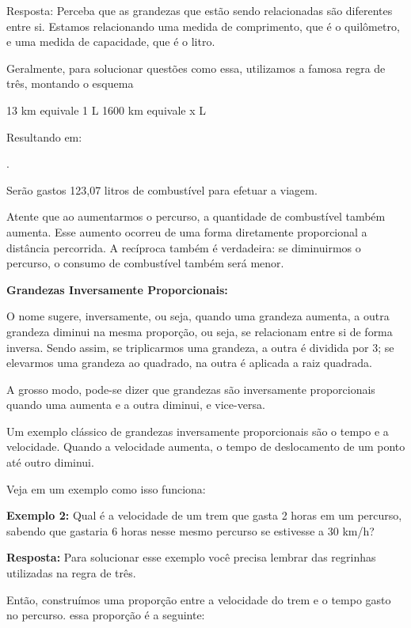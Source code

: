 \begin{multicols*}{2}
	Resposta: Perceba que as grandezas que estão sendo relacionadas são diferentes entre si. Estamos relacionando uma medida de comprimento, que é o quilômetro, e uma medida de capacidade, que é o litro.

	Geralmente, para solucionar questões como essa, utilizamos a famosa regra de três, montando o esquema

	13 km   equivale 1 L
	1600 km equivale x L

	Resultando em:


	.

	Serão gastos 123,07 litros de combustível para efetuar a viagem.

	Atente que ao aumentarmos o percurso, a quantidade de combustível também aumenta. Esse aumento ocorreu de uma forma diretamente proporcional a distância percorrida. A recíproca também é verdadeira: se diminuirmos o percurso, o consumo de combustível também será menor.

	\textbf{Grandezas Inversamente Proporcionais:}

	O nome sugere, inversamente, ou seja, quando uma grandeza aumenta, a outra grandeza diminui na mesma proporção, ou seja, se relacionam entre si de forma inversa. Sendo assim, se triplicarmos uma grandeza, a outra é dividida por 3; se elevarmos uma grandeza ao quadrado, na outra é aplicada a raiz quadrada.

	A grosso modo, pode-se dizer que grandezas são inversamente proporcionais quando uma aumenta e a outra diminui, e vice-versa.

	Um exemplo clássico de grandezas inversamente proporcionais são o tempo e a velocidade. Quando a velocidade aumenta, o tempo de deslocamento de um ponto até outro diminui.

	Veja em um exemplo como isso funciona:

	\textbf{Exemplo 2:} Qual é a velocidade de um trem que gasta 2 horas em um percurso, sabendo que gastaria 6 horas nesse mesmo percurso se estivesse a 30 km/h?

	\textbf{Resposta:} Para solucionar esse exemplo você precisa lembrar das regrinhas utilizadas na regra de três.

	Então, construímos uma proporção entre a velocidade do trem e o tempo gasto no percurso. essa proporção é a seguinte:

	\\


\end{multicols*}
